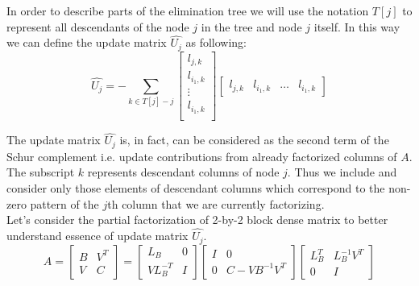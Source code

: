 In order to describe parts of the elimination tree we will use the notation $T[j]$ to represent all descendants of the node $j$ in the tree and node $j$ itself. In this way we can define the update matrix $\hat{U_{j}}$ as following:\\

\begin{equation} \label{eq:mm-2}
	\hat{U_{j}} = - \sum_{k \in T[j] -{j}}  \begin{bmatrix}
l_{j,k} \\
l_{i_1,k} \\
\vdots \\
l_{i_1,k} \\
\end{bmatrix} \begin{bmatrix}
l_{j,k} & l_{i_1,k} & \dots & l_{i_1,k}
\end{bmatrix} 
\end{equation}


The update matrix $\hat{U_{j}}$ is, in fact, can be considered as the second term of the Schur complement i.e. update contributions from already factorized columns of $A$.\\

The subscript $k$ represents descendant columns of node $j$. Thus we include and consider only those elements of descendant columns which correspond to the non-zero pattern of the $j$th column that we are currently factorizing.\\

Let's consider the partial factorization of 2-by-2 block dense matrix to better understand essence of update matrix $\hat{U_{j}}$.\\


\begin{equation} \label{eq:mm-3}
A = \begin{bmatrix}
B & V^{T} \\
V & C
\end{bmatrix} 
= 
\begin{bmatrix}
L_{B} & 0 \\
VL^{-T}_{B} & I
\end{bmatrix}
\begin{bmatrix}
I & 0 \\
0 & C - VB^{-1}V^{T}
\end{bmatrix} 
\begin{bmatrix}
L^{T}_{B} & L^{-1}_{B}V^{T} \\
0 & I
\end{bmatrix} 
\end{equation}

